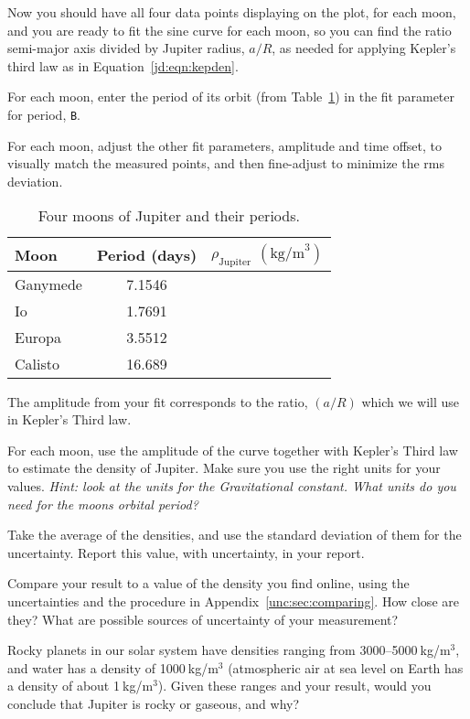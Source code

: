 Now you should have all four data points displaying on the plot, for each moon, and you are ready to fit the sine curve for each moon, so you can find the ratio semi-major axis divided by Jupiter radius, $a/R$, as needed for applying Kepler's third law as in Equation\ \ref{jd:eqn:kepden}.

\begin{steps}
	\item For each moon, enter the period of its orbit (from Table\ \ref{jd:tab:periods}) in the fit parameter for period, \texttt{B}.
	
	\item For each moon, adjust the other fit parameters, amplitude and time offset, to visually match the measured points, and then fine-adjust to minimize the rms deviation.
\end{steps}

\begin{table}
	\centering
	\begin{tabular}{ l c r }
		\hline
		Moon & Period (days) & $\rho_\textrm{Jupiter}$ $(\textrm{kg/m}^3)$\\
		\hline
		Ganymede & 7.1546 & \\
		Io & 1.7691 & \\
		Europa & 3.5512 & \\
		Calisto & 16.689 & \\
		\hline  
	\end{tabular}
	\caption{Four moons of Jupiter and their periods.}\label{jd:tab:periods}
\end{table}

The amplitude from your fit corresponds to the ratio, $(a/R)$ which we will use in Kepler’s Third law.

\begin{steps}
	\item For each moon, use the amplitude of the curve together with Kepler's Third law
	to estimate the density of Jupiter. Make sure you use the right units for your values. \textit{Hint:
	look at the units for the Gravitational constant. What units do you need for the moons
	orbital period?}

	\item\label{jd:step:density} Take the average of the densities, and use the standard deviation of them for the uncertainty. Report this value, with uncertainty, in your report.
	
	\item Compare your result to a value of the density you find online, using the uncertainties and the procedure in Appendix~\ref{unc:sec:comparing}. How close are they? What are possible sources of uncertainty of your measurement?
	
	\item\label{jd:step:composition} Rocky planets in our solar system have densities ranging from 3000--5000$\:$kg/m$^3$, and water has a density of 1000$\:$kg/m$^3$ (atmospheric air at sea level on Earth has a density of about 1$\:$kg/m$^3$). Given these ranges and your result, would you conclude that Jupiter is rocky or gaseous, and why?
\end{steps}

